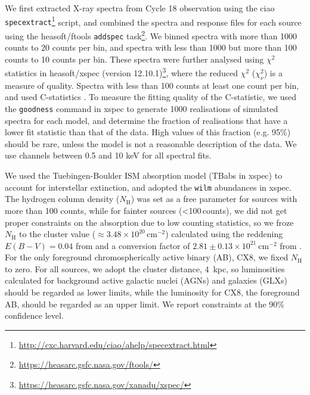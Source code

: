 \documentclass[fleqn,usenatbib]{mnras}
\newcommand{\revised}[1]{{\color{black}{#1}}}
\begin{document}
We first extracted X-ray spectra from %
\revised{each}
Cycle 18 observation using the {\sc ciao} {\tt specextract}\footnote{\url{http://cxc.harvard.edu/ciao/ahelp/specextract.html}} script, and combined the spectra and response files for each source using the {\sc heasoft/ftools} {\tt addspec} task\footnote{\url{https://heasarc.gsfc.nasa.gov/ftools/}}.
We binned spectra with more than 1000 counts to 20 counts per bin, and spectra with less than 1000 but more than 100 counts to 10 counts per bin. These spectra were further analysed using $\chi^2$ statistics in {\sc heasoft/xspec} (version 12.10.1)\footnote{\url{https://heasarc.gsfc.nasa.gov/xanadu/xspec/}}, where the reduced $\chi^2$ ($\chi_\nu^2$) is %
a measure of \revised{fit} quality. %
Spectra with less than 100 counts \revised{were binned  to} at least one count per bin, and used C-statistics \citep{Cash1979}. %
To measure the fitting quality of the C-statistic, we used the {\tt goodness} command in {\sc xspec} to generate 1000 realisations of simulated spectra for each model, and determine the fraction of realisations that have a lower fit statistic than that of the data. %
High values of this fraction (e.g. 95\%) should be rare, unless the model is not a reasonable description of the data.
We use channels between 0.5 and 10 keV for all spectral fits.

We used the Tuebingen-Boulder ISM absorption model (TBabs in {\sc xspec}) to account for interstellar extinction, and adopted the {\tt wilm} abundances \citep{Wilms2000} in {\sc xspec}. The hydrogen column density ($N_\mathrm{H}$) was set as a free parameter for sources with more than 100 counts, %
while for fainter sources (<100\,counts), we did not get proper constraints on the absorption due to low counting statistics, so we froze $N_\mathrm{H}$ to the cluster value ($\approx 3.48\times10^{20}\,\mathrm{cm^{-2}}$) calculated using the reddening $E(B-V)=0.04$ from \citet[2010 edition]{Harris96} and a conversion factor of $2.81 \pm 0.13 \times 10^{21}~\mathrm{cm^{-2}}$ from \citet{Bahramian15}. 
For the only foreground chromospherically active binary (AB), CX8, we fixed $N_\mathrm{H}$ to zero.%
For all sources, we adopt the cluster distance, 4\, kpc, so luminosities calculated for background active galactic nuclei (AGNs) and galaxies (GLXs) should be regarded as lower limits, while the luminosity for CX8, the foreground AB, should be regarded as an upper limit. %
We report \revised{spectral parameter} constraints
at the 90\% confidence level. 
\end{document}

